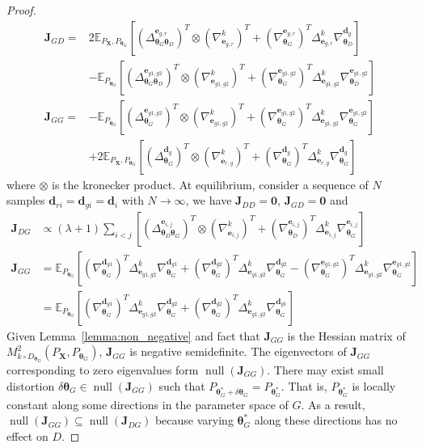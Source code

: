 \documentclass{article} %
\theoremstyle{plain}
\newtheorem*{proposition 1*}{Proposition 1}
\DeclareMathOperator{\nul}{null}
\newcommand{\set}[1]{\mathbb{#1}}  %
\newcommand{\rdv}[1]{\mathbf{#1}}  %
\begin{document}
\begin{appendices}
\begin{proof}
\begin{subequations}
\begin{align}
		\bm{J}_{GD} = 
		&2\set{E}_{P_{\rdv{X}},P_{\bm{\theta}_G}}[(\Delta_{\bm{\theta}_G\bm{\theta}_D}^{\bm{e}_{g,r}})^T\otimes(\nabla_{\bm{e}_{g,r}}^k)^T+(\nabla_{\bm{\theta}_G}^{\bm{e}_{g,r}})^T\Delta_{\bm{e}_{g,r}}^k\nabla_{\bm{\theta}_D}^{\bm{d}_{g}}] \nonumber\\ &-\set{E}_{P_{\bm{\theta}_G}}[(\Delta_{\bm{\theta}_G\bm{\theta}_D}^{\bm{e}_{g1,g2}})^T\otimes(\nabla_{\bm{e}_{g1,g2}}^k)^T+(\nabla_{\bm{\theta}_G}^{\bm{e}_{g1,g2}})^T\Delta_{\bm{e}_{g1,g2}}^k\nabla_{\bm{\theta}_D}^{\bm{e}_{g1,g2}}] \\
		\bm{J}_{GG} =  &-\set{E}_{P_{\bm{\theta}_G}}[(\Delta_{\bm{\theta}_G}^{\bm{e}_{g1,g2}})^T\otimes(\nabla_{\bm{e}_{g1,g2}}^k)^T+(\nabla_{\bm{\theta}_G}^{\bm{e}_{g1,g2}})^T\Delta_{\bm{e}_{g1,g2}}^k\nabla_{\bm{\theta}_G}^{\bm{e}_{g1,g2}}] \nonumber\\
		&+2\set{E}_{P_{\rdv{X}},P_{\bm{\theta}_G}}[(\Delta_{\bm{\theta}_G}^{\bm{d}_{g}})^T\otimes(\nabla_{\bm{e}_{r,g}}^k)^T+(\nabla_{\bm{\theta}_G}^{\bm{d}_{g}})^T\Delta_{\bm{e}_{r,g}}^k\nabla_{\bm{\theta}_G}^{\bm{d}_{g}}]
		\end{align}
	\end{subequations}
	where \(\otimes\) is the kronecker product. At equilibrium, consider a sequence of \(N\) samples \(\bm{d}_{ri}=\bm{d}_{gi}=\bm{d}_{i}\) with \(N\to\infty\), we have \(\bm{J}_{DD}=\bm{0}\), \(\bm{J}_{GD}=\bm{0}\) and 
	\begin{align*}
		\bm{J}_{DG}&\propto 
		(\lambda+1)\sum_{i<j}[(\Delta_{\bm{\theta}_D\bm{\theta}_G}^{\bm{e}_{i,j}})^T\otimes(\nabla_{\bm{e}_{i,j}}^k)^T+(\nabla_{\bm{\theta}_D}^{\bm{e}_{i,j}})^T\Delta_{\bm{e}_{i,j}}^k\nabla_{\bm{\theta}_G}^{\bm{e}_{i,j}}] \\
		\bm{J}_{GG}&=\set{E}_{P_{\bm{\theta}_G}}[(\nabla_{\bm{\theta}_G}^{\bm{d}_{g1}})^T\Delta_{\bm{e}_{g1,g2}}^k\nabla_{\bm{\theta}_G}^{\bm{d}_{g1}}+(\nabla_{\bm{\theta}_G}^{\bm{d}_{g2}})^T\Delta_{\bm{e}_{g1,g2}}^k\nabla_{\bm{\theta}_G}^{\bm{d}_{g2}}-(\nabla_{\bm{\theta}_G}^{\bm{e}_{g1,g2}})^T\Delta_{\bm{e}_{g1,g2}}^k\nabla_{\bm{\theta}_G}^{\bm{e}_{g1,g2}}] \\
		&=\set{E}_{P_{\bm{\theta}_G}}[(\nabla_{\bm{\theta}_G}^{\bm{d}_{g1}})^T\Delta_{\bm{e}_{g1,g2}}^k\nabla_{\bm{\theta}_G}^{\bm{d}_{g2}}+(\nabla_{\bm{\theta}_G}^{\bm{d}_{g2}})^T\Delta_{\bm{e}_{g1,g2}}^k\nabla_{\bm{\theta}_G}^{\bm{d}_{g1}}]
	\end{align*}
	Given Lemma~\ref{lemma:non_negative} and fact that \(\bm{J}_{GG}\) is the Hessian matrix of \(M_{k\circ D_{\bm{\theta}_D}}^2(P_{\rdv{X}},P_{\bm{\theta}_G})\), \(\bm{J}_{GG}\) is negative semidefinite. The eigenvectors of \(\bm{J}_{GG}\) corresponding to zero eigenvalues form \(\nul(\bm{J}_{GG})\). There may exist small distortion \(\delta\bm{\theta}_G\in\nul(\bm{J}_{GG})\) such that \(P_{\bm{\theta}_G^*+\delta\bm{\theta}_G}=P_{\bm{\theta}_G^*}\). That is, \(P_{\bm{\theta}_G^*}\) is locally constant along some directions in the parameter space of \(G\). As a result, \(\nul(\bm{J}_{GG})\subseteq\nul(\bm{J}_{DG})\) because varying \(\bm{\theta}_G^*\) along these directions has no effect on \(D\). 
	

\end{proof}
\end{appendices}
\end{document}

